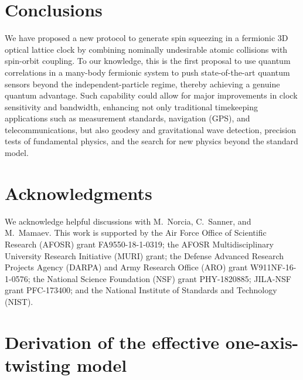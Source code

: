 \documentclass[aps,prx,superscriptaddress,notitlepage,twocolumn,longbibliography]{revtex4-2}
\begin{document}
\section{Conclusions}

We have proposed a new protocol to generate spin squeezing in a fermionic 3D optical lattice clock by combining nominally undesirable atomic collisions with spin-orbit coupling.
To our knowledge, this is the first proposal to use quantum correlations in a many-body fermionic system to push state-of-the-art quantum sensors beyond the independent-particle regime, thereby achieving a genuine quantum advantage.
Such capability could allow for major improvements in clock sensitivity and bandwidth, enhancing not only traditional timekeeping applications such as measurement standards, navigation (GPS), and telecommunications, but also geodesy and gravitational wave detection, precision tests of fundamental physics, and the search for new physics beyond the standard model\cite{safronova2018search}.


\section{Acknowledgments}

We acknowledge helpful discussions with M.~Norcia, C.~Sanner, and M.~Mamaev.
This work is supported by the Air Force Office of Scientific Research (AFOSR) grant FA9550-18-1-0319; the AFOSR Multidisciplinary University Research Initiative (MURI) grant; the Defense Advanced Research Projects Agency (DARPA) and Army Research Office (ARO) grant W911NF-16-1-0576; the National Science Foundation (NSF) grant PHY-1820885; JILA-NSF grant PFC-173400; and the
National Institute of Standards and Technology (NIST).


\appendix

\renewcommand\thefigure{\thesection\arabic{figure}}

\section{Derivation of the effective one-axis-twisting model}
\label{sec:derivation_OAT}
\end{document}
